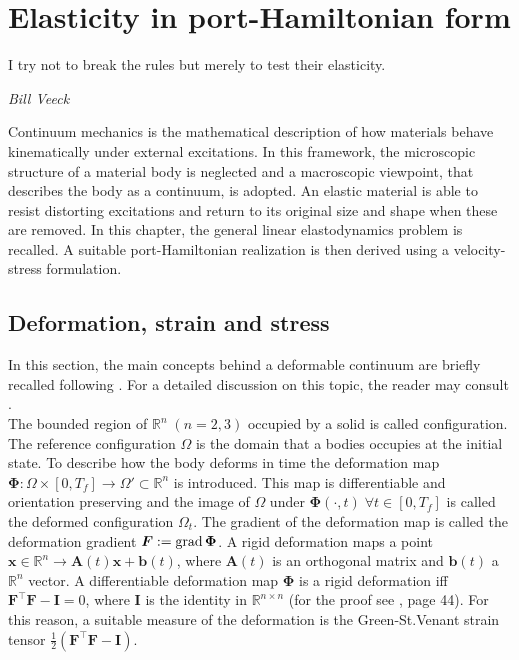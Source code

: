 \chapter{Elasticity in port-Hamiltonian form}

\epigraph{I try not to break the rules but merely to test their elasticity.}{\textit{Bill Veeck}}
\minitoc

Continuum mechanics is the mathematical description of how materials behave kinematically under external excitations. In this framework, the microscopic structure of a material body is neglected and a macroscopic viewpoint, that describes the body as a continuum, is adopted. An elastic material is able to resist distorting excitations and return to its original size and shape when these are removed. In this chapter, the general linear elastodynamics problem is recalled. A suitable port-Hamiltonian realization is then derived using a velocity-stress formulation.

\section{Deformation, strain and stress}
In this section, the main concepts behind a deformable continuum are briefly recalled following \cite{lee2012mixed}. For a detailed discussion on this topic, the reader may consult \cite{abeyaratne2012notes,landau2012elasticity}. \\

The bounded region of $\mathbb{R}^n \; (n=2, 3)$ occupied by a solid is called configuration. The reference configuration $\Omega$ is the domain that a bodies occupies at the initial state. To describe how the body deforms in time the deformation map $\bm\Phi: \Omega \times [0, T_f] \rightarrow \Omega' \subset \mathbb{R}^n$ is introduced. This map is differentiable and orientation preserving and the image of $\Omega$ under $\bm\Phi(\cdot, t) \; \forall t \in [0, T_f]$ is called the deformed configuration $\Omega_t$. The gradient of the deformation map is called the deformation gradient $\bm{F}:=\operatorname*{grad}\bm{\Phi}$. A rigid deformation maps a point $\bm{x} \in \mathbb{R}^n \rightarrow \bm{A}(t) \bm{x} + \bm{b}(t)$, where $\bm{A}(t)$ is an orthogonal matrix and $\bm{b}(t)$ a $\mathbb{R}^n$ vector. A differentiable deformation map $\bm\Phi$ is a rigid deformation iff $\bm{F}^\top \bm{F} - \bm{I} = 0$,  where $\bm{I}$ is the identity in $\mathbb{R}^{n\times n}$ (for the proof see \cite{ciarlet1988mathematical}, page 44). For this reason, a suitable measure of the deformation is the Green-St.Venant strain tensor $\frac{1}{2} (\bm{F}^\top \bm{F} - \bm{I})$.  \\

